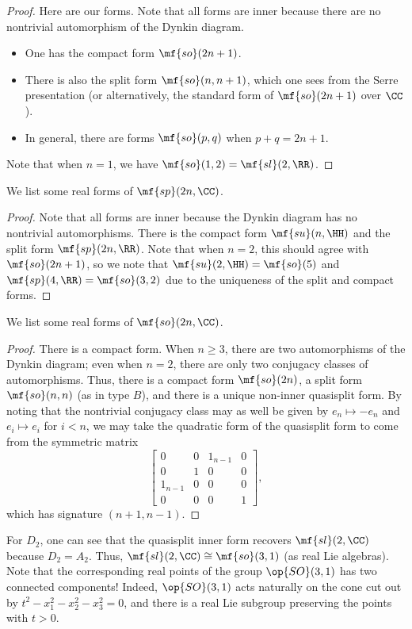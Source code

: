 \documentclass[../notes.tex]{subfiles}
\begin{document}
\begin{proof}
	Here are our forms. Note that all forms are inner because there are no nontrivial automorphism of the Dynkin diagram.
	\begin{itemize}
		\item One has the compact form $\mf{so}(2n+1)$.
		\item There is also the split form $\mf{so}(n,n+1)$, which one sees from the Serre presentation (or alternatively, the standard form of $\mf{so}(2n+1)$ over $\CC$).
		\item In general, there are forms $\mf{so}(p,q)$ when $p+q=2n+1$.
	\end{itemize}
	Note that when $n=1$, we have $\mf{so}(1,2)=\mf{sl}(2,\RR)$.
\end{proof}
\begin{exe}
	We list some real forms of $\mf{sp}(2n,\CC)$.
\end{exe}
\begin{proof}
	Note that all forms are inner because the Dynkin diagram has no nontrivial automorphisms. There is the compact form $\mf{su}(n,\HH)$ and the split form $\mf{sp}(2n,\RR)$. Note that when $n=2$, this should agree with $\mf{so}(2n+1)$, so we note that $\mf{su}(2,\HH)=\mf{so}(5)$ and $\mf{sp}(4,\RR)=\mf{so}(3,2)$ due to the uniqueness of the split and compact forms.
\end{proof}
\begin{exe}
	We list some real forms of $\mf{so}(2n,\CC)$.
\end{exe}
\begin{proof}
	There is a compact form. When $n\ge3$, there are two automorphisms of the Dynkin diagram; even when $n=2$, there are only two conjugacy classes of automorphisms. Thus, there is a compact form $\mf{so}(2n)$, a split form $\mf{so}(n,n)$ (as in type $B$), and there is a unique non-inner quasisplit form. By noting that the nontrivial conjugacy class may as well be given by $e_n\mapsto-e_n$ and $e_i\mapsto e_i$ for $i<n$, we may take the quadratic form of the quasisplit form to come from the symmetric matrix
	\[\begin{bmatrix}
		0 & 0 & 1_{n-1} & 0 \\
		0 & 1 & 0 & 0 \\
		1_{n-1} & 0 & 0 & 0 \\
		0 & 0 & 0 & 1
	\end{bmatrix},\]
	which has signature $(n+1,n-1)$.
\end{proof}
\begin{example}
	For $D_2$, one can see that the quasisplit inner form recovers $\mf{sl}(2,\CC)$ because $D_2=A_2$. Thus, $\mf{sl}(2,\CC)\cong\mf{so}(3,1)$ (as real Lie algebras). Note that the corresponding real points of the group $\op{SO}(3,1)$ has two connected components! Indeed, $\op{SO}(3,1)$ acts naturally on the cone cut out by $t^2-x_1^2-x_2^2-x_3^2=0$, and there is a real Lie subgroup preserving the points with $t>0$.
\end{example}
\end{document}
